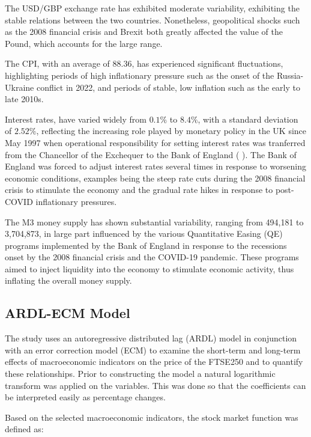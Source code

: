 \documentclass[11pt,a4paper]{article}
\newcommand{\citeboth}[1]{\citeauthor{#1} \citep{#1}}
\begin{document}
The USD/GBP exchange rate has exhibited moderate variability, exhibiting the stable relations between 
the two countries. Nonetheless, geopolitical shocks such as the 2008 financial crisis and Brexit both greatly affected the value of the Pound, 
which accounts for the large range. 

The CPI, with an average of 88.36, has 
experienced significant fluctuations, highlighting periods of high inflationary pressure such as the onset of the Russia-Ukraine conflict in 2022, and periods of stable, low
inflation such as the early to late 2010s.

Interest rates, have varied widely from $0.1\%$ to $8.4\%$, with a standard deviation of $2.52\%$, reflecting the 
increasing role played by monetary policy in the UK since May 1997 when operational responsibility for setting interest rates was tranferred from the Chancellor of the Exchequer to the Bank of England (\citeboth{king1997changes}). The Bank of England was forced to adjust interest rates 
several times in response to worsening economic conditions, examples being the steep rate cuts during the 2008 financial crisis to stimulate the economy and the gradual rate hikes in response to 
post-COVID inflationary pressures. 

The M3 money supply has shown substantial variability, ranging from 494,181 to 3,704,873, 
in large part influenced by the various Quantitative Easing (QE) programs implemented by the Bank of England 
in response to the recessions onset by the 2008 financial crisis and the COVID-19 pandemic. These programs aimed to inject liquidity into the economy to stimulate economic activity, thus inflating the overall money supply.

\subsection{ARDL-ECM Model}

The study uses an autoregressive distributed lag (ARDL) model in conjunction with 
an error correction model (ECM) to examine the short-term and long-term effects of macroeconomic indicators on the price of the FTSE250
and to quantify these relationships. Prior to constructing the model a natural logarithmic transform was applied
on the variables. This was done so that the coefficients can be interpreted easily as percentage changes. 

Based on the selected macroeconomic indicators,
the stock market function was defined as:
\end{document}
